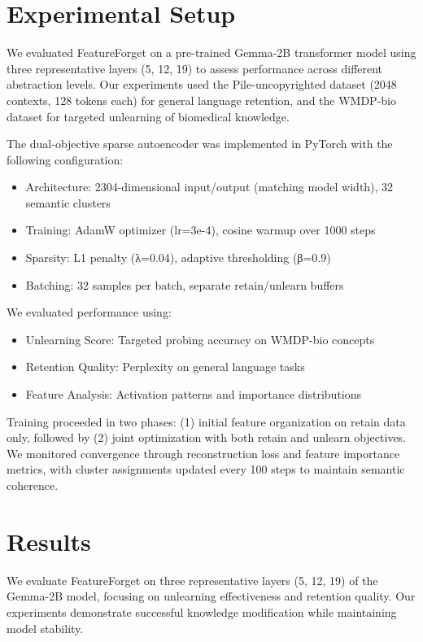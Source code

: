 \documentclass{article} %
\begin{document}
\section{Experimental Setup}
\label{sec:experimental}

We evaluated FeatureForget on a pre-trained Gemma-2B transformer model using three representative layers (5, 12, 19) to assess performance across different abstraction levels. Our experiments used the Pile-uncopyrighted dataset (2048 contexts, 128 tokens each) for general language retention, and the WMDP-bio dataset for targeted unlearning of biomedical knowledge.

The dual-objective sparse autoencoder was implemented in PyTorch with the following configuration:
\begin{itemize}
    \item Architecture: 2304-dimensional input/output (matching model width), 32 semantic clusters
    \item Training: AdamW optimizer (lr=3e-4), cosine warmup over 1000 steps
    \item Sparsity: L1 penalty (λ=0.04), adaptive thresholding (β=0.9)
    \item Batching: 32 samples per batch, separate retain/unlearn buffers
\end{itemize}

We evaluated performance using:
\begin{itemize}
    \item Unlearning Score: Targeted probing accuracy on WMDP-bio concepts
    \item Retention Quality: Perplexity on general language tasks
    \item Feature Analysis: Activation patterns and importance distributions
\end{itemize}

Training proceeded in two phases: (1) initial feature organization on retain data only, followed by (2) joint optimization with both retain and unlearn objectives. We monitored convergence through reconstruction loss and feature importance metrics, with cluster assignments updated every 100 steps to maintain semantic coherence.

\section{Results}
\label{sec:results}

We evaluate FeatureForget on three representative layers (5, 12, 19) of the Gemma-2B model, focusing on unlearning effectiveness and retention quality. Our experiments demonstrate successful knowledge modification while maintaining model stability.
\end{document}
